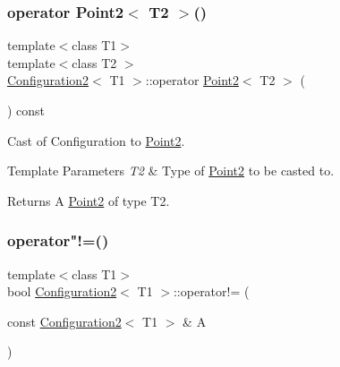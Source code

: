 \mbox{\label{class_configuration2_a68bfa8b94c1cff3179698e00edb2890e}} 
\subsubsection{\texorpdfstring{operator Point2$<$ T2 $>$()}{operator Point2< T2 >()}}
{\footnotesize\ttfamily template$<$class T1$>$ \\
template$<$class T2 $>$ \\
\mbox{\hyperlink{class_configuration2}{Configuration2}}$<$ T1 $>$\+::operator \mbox{\hyperlink{class_point2}{Point2}}$<$ T2 $>$ (\begin{DoxyParamCaption}{ }\end{DoxyParamCaption}) const\hspace{0.3cm}{\ttfamily [inline]}}



Cast of Configuration to \mbox{\hyperlink{class_point2}{Point2}}. 


\begin{DoxyTemplParams}{Template Parameters}
{\em T2} & Type of \mbox{\hyperlink{class_point2}{Point2}} to be casted to. \\
\hline
\end{DoxyTemplParams}
\begin{DoxyReturn}{Returns}
A \mbox{\hyperlink{class_point2}{Point2}} of type T2. 
\end{DoxyReturn}
\mbox{\label{class_configuration2_a616d2dd99d9250eeda1bc933e7b0a2da}} 
\subsubsection{\texorpdfstring{operator"!=()}{operator!=()}}
{\footnotesize\ttfamily template$<$class T1$>$ \\
bool \mbox{\hyperlink{class_configuration2}{Configuration2}}$<$ T1 $>$\+::operator!= (\begin{DoxyParamCaption}\item[{const \mbox{\hyperlink{class_configuration2}{Configuration2}}$<$ T1 $>$ \&}]{A }\end{DoxyParamCaption})\hspace{0.3cm}{\ttfamily [inline]}}




